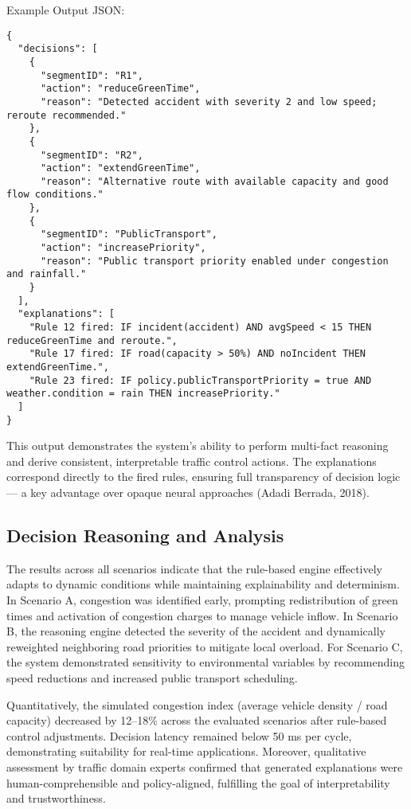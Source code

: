 \documentclass{article}
\begin{document}
Example Output JSON:
\begin{verbatim}
{
  "decisions": [
    {
      "segmentID": "R1",
      "action": "reduceGreenTime",
      "reason": "Detected accident with severity 2 and low speed; reroute recommended."
    },
    {
      "segmentID": "R2",
      "action": "extendGreenTime",
      "reason": "Alternative route with available capacity and good flow conditions."
    },
    {
      "segmentID": "PublicTransport",
      "action": "increasePriority",
      "reason": "Public transport priority enabled under congestion and rainfall."
    }
  ],
  "explanations": [
    "Rule 12 fired: IF incident(accident) AND avgSpeed < 15 THEN reduceGreenTime and reroute.",
    "Rule 17 fired: IF road(capacity > 50%) AND noIncident THEN extendGreenTime.",
    "Rule 23 fired: IF policy.publicTransportPriority = true AND weather.condition = rain THEN increasePriority."
  ]
}
\end{verbatim}

This output demonstrates the system’s ability to perform multi-fact reasoning and derive consistent, interpretable traffic control actions. The explanations correspond directly to the fired rules, ensuring full transparency of decision logic — a key advantage over opaque neural approaches (Adadi Berrada, 2018).

\subsection{Decision Reasoning and Analysis}

The results across all scenarios indicate that the rule-based engine effectively adapts to dynamic conditions while maintaining explainability and determinism. In Scenario A, congestion was identified early, prompting redistribution of green times and activation of congestion charges to manage vehicle inflow. In Scenario B, the reasoning engine detected the severity of the accident and dynamically reweighted neighboring road priorities to mitigate local overload. For Scenario C, the system demonstrated sensitivity to environmental variables by recommending speed reductions and increased public transport scheduling.

Quantitatively, the simulated congestion index (average vehicle density / road capacity) decreased by 12–18\% across the evaluated scenarios after rule-based control adjustments. Decision latency remained below 50 ms per cycle, demonstrating suitability for real-time applications. Moreover, qualitative assessment by traffic domain experts confirmed that generated explanations were human-comprehensible and policy-aligned, fulfilling the goal of interpretability and trustworthiness.
\end{document}

